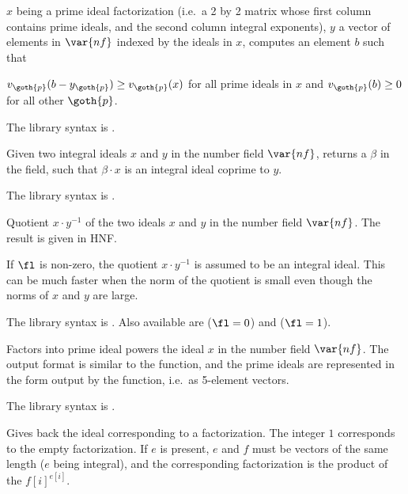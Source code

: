 \label{se:idealchinese}
$x$ being a prime ideal factorization
(i.e.~a 2 by 2 matrix whose first column contains prime ideals, and the second
column integral exponents), $y$ a vector of elements in $\var{nf}$ indexed by
the ideals in $x$, computes an element $b$ such that

$v_{\goth{p}}(b - y_{\goth{p}}) \geq v_{\goth{p}}(x)$ for all prime ideals
in $x$ and $v_{\goth{p}}(b)\geq 0$ for all other $\goth{p}$.

The library syntax is .

\label{se:idealcoprime}
Given two integral ideals $x$ and $y$
in the number field $\var{nf}$, returns a $\beta$ in the field,
such that $\beta\cdot x$ is an integral ideal coprime to $y$.

The library syntax is .

\label{se:idealdiv}
Quotient $x\cdot y^{-1}$ of the two ideals $x$ and $y$ in the number
field $\var{nf}$. The result is given in HNF.

If $\fl$ is non-zero, the quotient $x \cdot y^{-1}$ is assumed to be an
integral ideal. This can be much faster when the norm of the quotient is
small even though the norms of $x$ and $y$ are large.

The library syntax is .
Also available are 
($\fl=0$) and  ($\fl=1$).

\label{se:idealfactor}
Factors into prime ideal powers the
ideal $x$ in the number field $\var{nf}$. The output format is similar to the
 function, and the prime ideals are represented in the form
output by the  function, i.e.~as 5-element vectors.

The library syntax is .

\label{se:idealfactorback}
Gives back the ideal corresponding to a factorization. The integer $1$
corresponds to the empty factorization.
If $e$ is present, $e$ and $f$ must be vectors of the same length ($e$ being
integral), and the corresponding factorization is the product of the
$f[i]^{e[i]}$.

